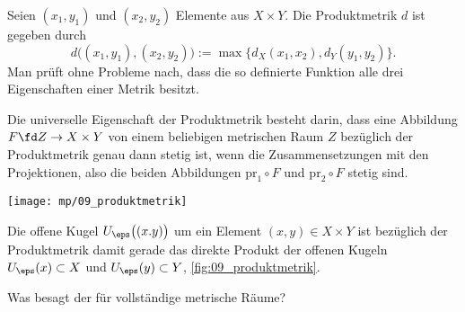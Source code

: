\begin{antwort}
  Seien $(x_1,y_1)$ und $(x_2,y_2)$ Elemente aus $X\times Y$.  
  Die Produktmetrik $d$ ist gegeben durch 
  \[
  d \big( (x_1, y_1 ), (x_2,y_2) \big) := 
  \max\{ d_X(x_1, x_2), d_Y( y_1, y_2 ) \}.
  \]
  Man prüft ohne Probleme nach, dass die so definierte Funktion 
  alle drei Eigenschaften einer Metrik besitzt. 


  Die universelle Eigenschaft der Produktmetrik besteht darin, dass 
  eine Abbildung $F \fd Z\to X\times Y$ von einem beliebigen 
  metrischen Raum 
  $Z$ bezüglich der Produktmetrik genau dann stetig ist, wenn die 
  Zusammensetzungen mit den Projektionen, also die beiden 
  Abbildungen $\mathrm{pr}_1\circ F$ und 
  $\mathrm{pr}_2\circ F$ stetig sind. 

  \begin{center}
    \texttt{[image: mp/09\_produktmetrik]}
    \label{fig:09_produktmetrik}
  \end{center}

  Die offene Kugel $U_\eps \big( (x.y) \big)$ um ein Element 
  $(x,y)\in X\times Y$ ist bezüglich der Produktmetrik damit 
  gerade das direkte Produkt der offenen Kugeln 
  $U_\eps(x) \subset X$ und $U_\eps( y ) \subset Y$, \sieheAbbildung\ref{fig:09_produktmetrik}.
  \AntEnd
\end{antwort}

\begin{frage}\label{09_banach}
  Was besagt der  für  
  vollständige metrische Räume?
\end{frage}

